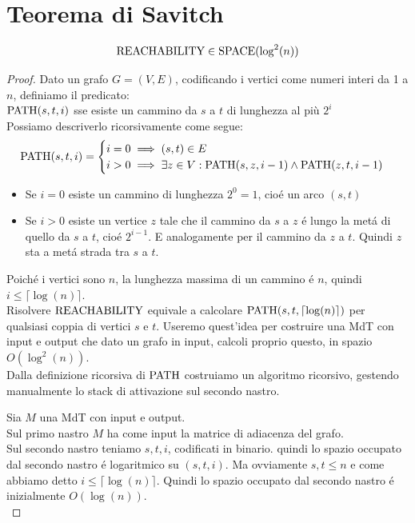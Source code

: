 \section{Teorema di Savitch}
\label{theorem:savitch}
\[
\text{REACHABILITY} \in \text{SPACE}(\log^2(n))
\]

\begin{proof}
Dato un grafo $G = (V, E)$, codificando i vertici come numeri interi da 1 a $n$, definiamo il predicato: \\

$\text{PATH}(s, t, i)$ sse esiste un cammino da $s$ a $t$ di lunghezza al più $2^i$ \\

Possiamo descriverlo ricorsivamente come segue:
\[
\text{PATH}(s, t, i) =
\begin{cases}
    i = 0 \implies (s, t) \in E \\
    i > 0 \implies \exists z \in V : \text{PATH}(s, z, i-1) \land \text{PATH}(z, t, i-1)
\end{cases}
\]
\begin{itemize}
    \item Se $i = 0$ esiste un cammino di lunghezza $2^0 = 1$, cioé un arco $(s,t)$
    \item Se $i > 0$ esiste un vertice $z$ tale che il cammino da $s$ a $z$ é lungo la metá di quello da $s$ a $t$, cioé $2^{i-1}$.
        E analogamente per il cammino da $z$ a $t$. Quindi $z$ sta a metá strada tra $s$ a $t$. \\
\end{itemize} 

Poiché i vertici sono $n$, la lunghezza massima di un cammino é $n$, quindi $i \leq \lceil \log(n) \rceil$. \\

Risolvere $\text{REACHABILITY}$ equivale a calcolare 
$\text{PATH}(s, t, \lceil \log(n) \rceil)$ per qualsiasi coppia di vertici $s$ e $t$.
Useremo quest'idea per costruire una MdT con input e output che dato un grafo in input,
calcoli proprio questo, in spazio $O(\log^2(n))$. \\ 

Dalla definizione ricorsiva di $\text{PATH}$ costruiamo un algoritmo ricorsivo,
gestendo manualmente lo stack di attivazione sul secondo nastro.

Sia $M$ una MdT con input e output. \\
Sul primo nastro $M$ ha come input la matrice di adiacenza del grafo.\\

Sul secondo nastro teniamo $s, t, i$, codificati in binario.
quindi lo spazio occupato dal secondo nastro é logaritmico su $(s, t, i)$.
Ma ovviamente $s, t \leq n$ e come abbiamo detto $i \leq \lceil \log(n) \rceil$.
Quindi lo spazio occupato dal secondo nastro é inizialmente $O(\log(n))$. \\


\end{proof}
